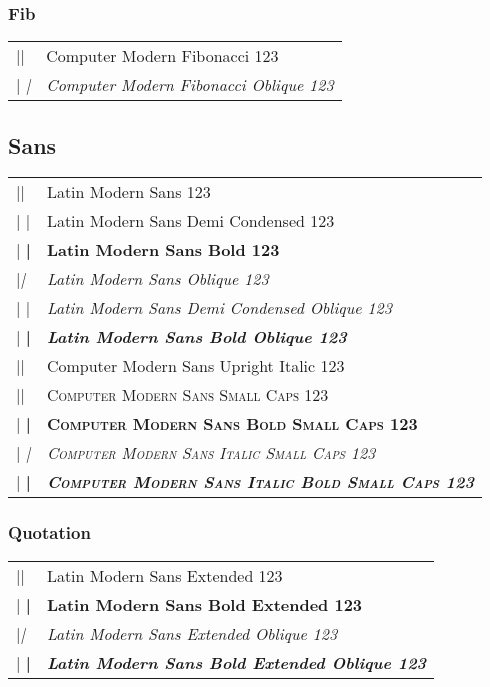 \documentclass{article}
\makeatletter
\newenvironment{vrb}{\begin{tabular}{@{}p{5cm}l@{}}}{\end{tabular}}
\makeatother
\begin{document}
\subsubsection*{Fib}

\selectfont
\begin{vrb}
|\fontfamily{cmfib}\selectfont | & {Computer Modern Fibonacci 123} \\
|  \slshape| & {\slshape Computer Modern Fibonacci Oblique 123} \\
\end{vrb}

\subsection*{Sans}

\sffamily
\begin{vrb}
|\sffamily| & {Latin Modern Sans 123} \\
|  \fontseries{sbc}\selectfont| & {\fontseries{sbc}\selectfont Latin Modern Sans Demi Condensed 123} \\
|  \bfseries| & {\bfseries Latin Modern Sans Bold 123} \\
|\slshape| & {\slshape Latin Modern Sans Oblique 123} \\
|  \fontseries{sbc}\selectfont| & {\fontseries{sbc}\selectfont\slshape Latin Modern Sans Demi Condensed Oblique 123} \\
|  \bfseries| & {\bfseries\slshape Latin Modern Sans Bold Oblique 123} \\
|\uishape| & {\uishape Computer Modern Sans Upright Italic 123} \\
|\scshape| & {\scshape Computer Modern Sans Small Caps 123} \\
|  \bfseries| & {\bfseries\scshape Computer Modern Sans Bold Small Caps 123} \\
|  \itshape| & {\itshape\scshape Computer Modern Sans Italic Small Caps 123} \\
|    \bfseries| & {\itshape\bfseries\scshape Computer Modern Sans Italic Bold Small Caps 123} \\
\end{vrb}

\subsubsection*{Quotation}

\qtstyle
\begin{vrb}
|\qtstyle | & {Latin Modern Sans Extended 123} \\
|  \bfseries | & {\bfseries Latin Modern Sans Bold Extended 123} \\
|\slshape | & {\slshape Latin Modern Sans Extended Oblique 123} \\
|  \bfseries | & {\bfseries\slshape Latin Modern Sans Bold Extended Oblique 123} \\
\end{vrb}
\end{document}

